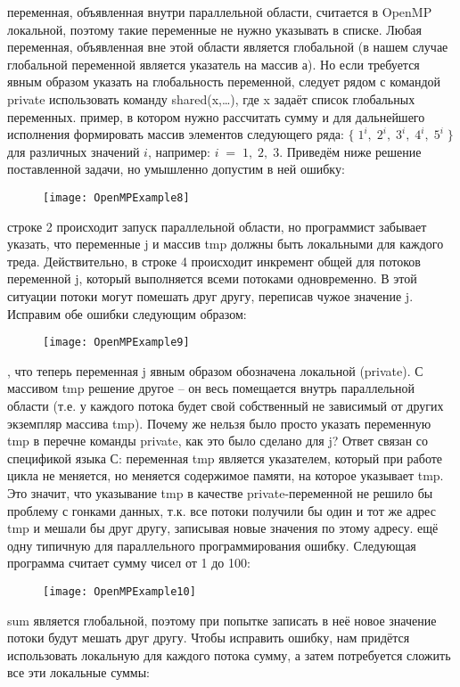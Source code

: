 {	 переменная, объявленная внутри параллельной области, считается в OpenMP локальной, поэтому такие переменные не нужно указывать в списке. Любая переменная, объявленная вне этой области является глобальной (в нашем случае глобальной переменной является указатель на массив $а$). Но если требуется явным образом указать на глобальность переменной, следует рядом с командой private использовать команду shared(x,\ldots), где x задаёт список глобальных переменных.
	 пример, в котором нужно рассчитать сумму и для дальнейшего исполнения формировать массив элементов следующего ряда: $\{\;1^i,\;2^i,\;3^i,\;4^i,\;5^i\;\}$ для различных значений $i$, например: $i\;=\;1,\;2,\;3$. Приведём ниже решение поставленной задачи, но умышленно допустим в ней ошибку:
	\begin{figure}[H]
		\texttt{[image: OpenMPExample8]}
	\end{figure}
	 строке 2 происходит запуск параллельной области, но программист забывает указать, что переменные j и массив tmp должны быть локальными для каждого треда. Действительно, в строке 4 происходит инкремент общей для потоков переменной j, который выполняется всеми потоками одновременно. В этой ситуации потоки могут помешать друг другу, переписав чужое значение j. Исправим обе ошибки следующим образом:
	\begin{figure}[H]
		\texttt{[image: OpenMPExample9]}
	\end{figure}
	, что теперь переменная j явным образом обозначена локальной (private). С массивом tmp решение другое – он весь помещается внутрь параллельной области (т.е. у каждого потока будет свой собственный не зависимый от других экземпляр массива tmp). Почему же нельзя было просто указать переменную tmp в перечне команды private, как это было сделано для j? Ответ связан со спецификой языка С: переменная tmp является указателем, который при работе цикла не меняется, но меняется содержимое памяти, на которое указывает tmp. Это значит, что указывание tmp в качестве private-переменной не решило бы проблему с гонками данных, т.к. все потоки получили бы один и тот же адрес tmp и мешали бы друг другу, записывая новые значения по этому адресу.
	 ещё одну типичную для параллельного программирования ошибку. Следующая программа считает сумму чисел от 1 до 100:
	\begin{figure}[H]
		\texttt{[image: OpenMPExample10]}
	\end{figure}
	 sum является глобальной, поэтому при попытке записать в неё новое значение потоки будут мешать друг другу. Чтобы исправить ошибку, нам придётся использовать локальную для каждого потока сумму, а затем потребуется сложить все эти локальные суммы:
}
